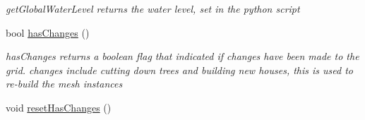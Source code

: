 \begin{DoxyCompactItemize}
\begin{DoxyCompactList}\small\item\em get\+Global\+Water\+Level returns the water level, set in the python script \end{DoxyCompactList}\item 
bool \hyperlink{class_grid_a432ceeb0a83639a4e6da8a70909a135e}{has\+Changes} ()
\begin{DoxyCompactList}\small\item\em has\+Changes returns a boolean flag that indicated if changes have been made to the grid. changes include cutting down trees and building new houses, this is used to re-\/build the mesh instances \end{DoxyCompactList}\item 
\hypertarget{class_grid_a2b229f174c7458baaf7ebeb3eb378707}{}void \hyperlink{class_grid_a2b229f174c7458baaf7ebeb3eb378707}{reset\+Has\+Changes} ()\label{class_grid_a2b229f174c7458baaf7ebeb3eb378707}


\end{DoxyCompactItemize}
